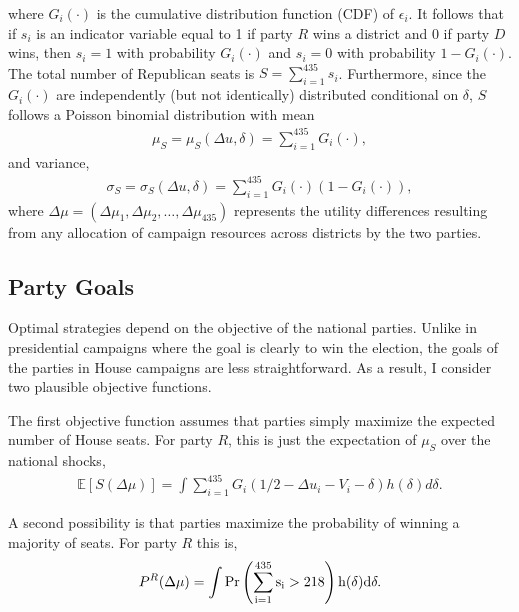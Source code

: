 \documentclass[12pt,final,fleqn]{article}
\theoremstyle{plain}
\newcommand\E{\mathbb{E}}
\begin{document}
where $G_i(\cdot)$ is the cumulative distribution function (CDF) of $\epsilon_i$. It follows that if $s_i$ is an indicator variable equal to 1 if party $R$ wins a district and $0$ if party $D$ wins, then $s_i = 1$ with probability $G_i(\cdot)$ and $s_i = 0$ with probability $1 - G_i(\cdot)$. The total number of Republican seats is $S = \sum_{i=1}^{435} s_i$. Furthermore, since the $G_i(\cdot)$ are independently (but not identically) distributed conditional on $\delta$, $S$ follows a Poisson binomial distribution with mean
\begin{align} \label{eqn: conditional seat mean}
\mu_S = \mu_S(\Delta u, \delta) =  \sum_{i=1}^{435} G_i(\cdot),
\end{align}
and variance,
\begin{align} \label{eqn: conditional seat variance}
\sigma_S = \sigma_S(\Delta u, \delta) = \sum_{i=1}^{435} G_i(\cdot)(1 - G_i(\cdot)),
\end{align}
where $\Delta \mu = \left(\Delta \mu_1, \Delta \mu_2, \ldots, \Delta \mu_{435} \right)$ represents the utility differences resulting from any allocation of campaign resources across districts by the two parties.

\subsection{Party Goals}
Optimal strategies depend on the objective of the national parties. Unlike in presidential campaigns where the goal is clearly to win the election, the goals of the parties in House campaigns are less straightforward. As a result, I consider two plausible objective functions. 

The first objective function assumes that parties simply maximize the expected number of House seats. For party $R$, this is just the expectation of $\mu_S$ over the national shocks,
\begin{align} \label{eqn: expected number of seats}
\E\left[S (\Delta \mu)\right] = \int \sum_{i=1}^{435} G_i(1/2 - \Delta u_i - V_i - \delta)h(\delta) d\delta.
\end{align}

A second possibility is that parties maximize the probability of winning a majority of seats. For party $R$ this is,
\begin{align}
P^R(\Delta \mu) = \int \rm{Pr}\left(\sum_{i=1}^{435} s_i > 218 \right) h(\delta)d \delta.
\end{align}
\end{document}
